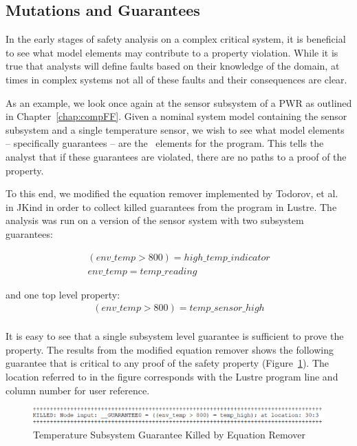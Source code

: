 \subsection{Mutations and Guarantees}
\label{sec:granularityMutationInputs}
In the early stages of safety analysis on a complex critical system, it is beneficial to see what model elements may contribute to a property violation. While it is true that analysts will define faults based on their knowledge of the domain, at times in complex systems not all of these faults and their consequences are clear. %

As an example, we look once again at the sensor subsystem of a PWR as outlined in Chapter~\ref{chap:compFF}. Given a nominal system model containing the sensor subsystem and a single temperature sensor, we wish to see what model elements -- specifically guarantees -- are the \mustcov\  elements for the program. This tells the analyst that if these guarantees are violated, there are no paths to a proof of the property. 

To this end, we modified the equation remover implemented by Todorov, et al.~\cite{NFM2020Todorov} in JKind in order to collect killed guarantees from the program in Lustre. The analysis was run on a version of the sensor system with two subsystem guarantees: 

\begin{gather*}
\mathit{(env\_temp > 800) = high\_temp\_indicator}\\
\mathit{env\_temp = temp\_reading}
\end{gather*}

and one top level property:
\begin{gather*}
\mathit{(env\_temp > 800) = temp\_sensor\_high}\\
\end{gather*}

It is easy to see that a single subsystem level guarantee is sufficient to prove the property. The results from the modified equation remover shows the following guarantee that is critical to any proof of the safety property (Figure~\ref{fig:guaranteesKilledSensor}). The location referred to in the figure corresponds with the Lustre program line and column number for user reference.

\begin{figure}[h]
	\begin{center}
		\includegraphics[scale=0.8]{images/guaranteesKilledSensor.PNG}
	\end{center}
	\caption{Temperature Subsystem Guarantee Killed by Equation Remover}
	\label{fig:guaranteesKilledSensor}
\end{figure}

